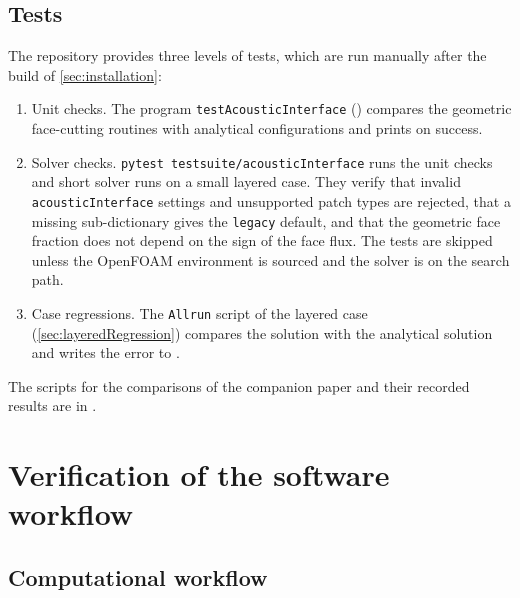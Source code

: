 \documentclass[final,12pt,nopreprintline]{elsarticle}
\newcommand{\code}[1]{\texttt{#1}}
\begin{document}
\subsection{Tests}
\label{sec:tests}

The repository provides three levels of tests, which are run manually after
the build of \cref{sec:installation}:
\begin{enumerate}
    \item Unit checks.  The program \code{testAcousticInterface}
    () compares the geometric
    face-cutting routines with analytical configurations and prints
     on success.
    \item Solver checks.  \code{pytest testsuite/acousticInterface} runs the
    unit checks and short solver runs on a small layered case.  They verify
    that invalid \code{acousticInterface} settings and unsupported patch types
    are rejected, that a missing sub-dictionary gives the \code{legacy}
    default, and that the geometric face fraction does not depend on the sign
    of the face flux.  The tests are skipped unless the OpenFOAM environment
    is sourced and the solver is on the search path.
    \item Case regressions.  The \code{Allrun} script of the layered case
    (\cref{sec:layeredRegression}) compares the solution with the analytical
    solution and writes the error to
    .
\end{enumerate}
The scripts for the comparisons of the companion paper
\cite{Xu2026HelmholtzPML} and their recorded results are in
.

\section{Verification of the software workflow}
\label{sec:verification}

\subsection{Computational workflow}
\label{sec:aiWorkflow}
\end{document}

